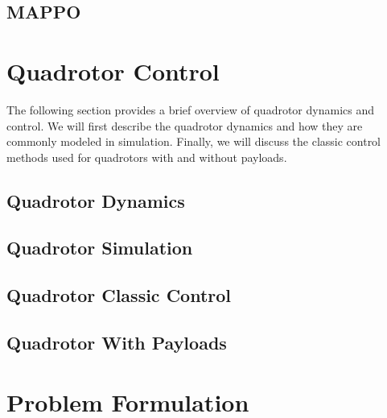 
\subsection{MAPPO}

\section{Quadrotor Control}
The following section provides a brief overview of quadrotor dynamics and control. We will first describe the quadrotor dynamics and how they are commonly modeled in simulation. Finally, we will discuss the classic control methods used for quadrotors with and without payloads.
\subsection{Quadrotor Dynamics}
\subsection{Quadrotor Simulation}
\subsection{Quadrotor Classic Control}
\subsection{Quadrotor With Payloads}

\section{Problem Formulation}


